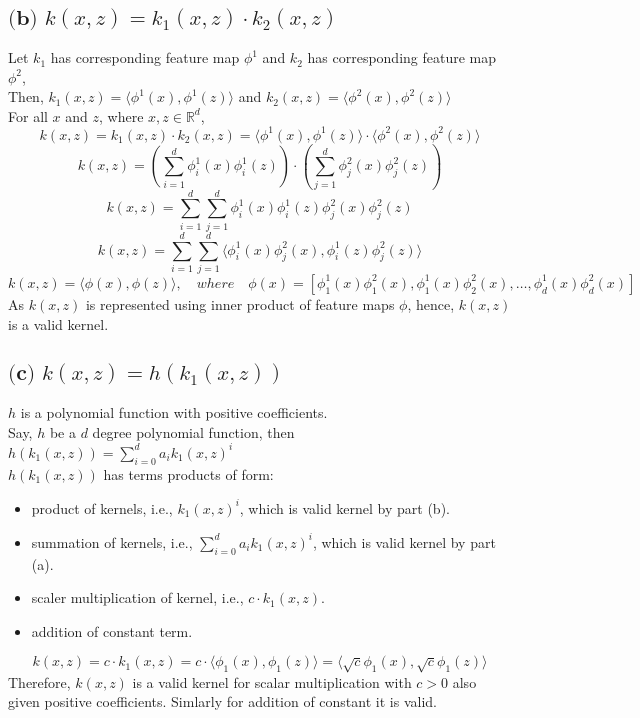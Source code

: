 \documentclass[12pt]{article}
\begin{document}
\subsection*{$ \textbf{(b) } k(x, z) = k_1(x, z) \cdot k_2(x, z) $}
Let $k_1$ has corresponding feature map $\phi^1$ and $k_2$ has corresponding feature map $\phi^2$, \\
Then, $k_1(x, z) = \langle \phi^1(x), \phi^1(z) \rangle$ and $k_2(x, z) = \langle \phi^2(x), \phi^2(z) \rangle$ \\
For all $x$ and $z$, where $x, z \in \mathbb{R}^d$,
$$ k(x, z) = k_1(x, z) \cdot k_2(x, z) = \langle \phi^1(x), \phi^1(z) \rangle \cdot \langle \phi^2(x), \phi^2(z) \rangle $$
$$ k(x, z) = \left (\sum_{i=1}^{d} \phi^1_i(x) \phi^1_i(z) \right )  \cdot \left (\sum_{j=1}^{d} \phi^2_j(x) \phi^2_j(z) \right )$$
$$ k(x, z) = \sum_{i=1}^{d} \sum_{j=1}^{d} \phi^1_i(x) \phi^1_i(z) \phi^2_j(x) \phi^2_j(z) $$
$$ k(x, z) = \sum_{i=1}^{d} \sum_{j=1}^{d} \langle \phi^1_i(x) \phi^2_j(x), \phi^1_i(z) \phi^2_j(z) \rangle $$
$$ k(x, z) = \langle \phi(x), \phi(z) \rangle , \quad where \quad \phi(x) = \left [ \phi^1_1(x) \phi^2_1(x), \phi^1_1(x) \phi^2_2(x), \ldots, \phi^1_d(x) \phi^2_d(x) \right ]$$
As $k(x, z)$ is represented using inner product of feature maps $\phi$, hence, $k(x, z)$ is a valid kernel.

\subsection*{$ \textbf{(c) } k(x, z) = h(k_1(x, z))$}
$h$ is a polynomial function with positive coefficients. \\
Say, $h$ be a $d$ degree polynomial function, then $h(k_1(x, z)) = \sum_{i=0}^{d} a_i k_1(x, z)^i$ \\
$ h(k_1(x, z)) $ has terms products of form:
\begin{itemize}
    \item product of kernels, i.e., $k_1(x, z)^i$, which is valid kernel by part (b).
    \item summation of kernels, i.e., $\sum_{i=0}^{d} a_i k_1(x, z)^i$, which is valid kernel by part (a).
    \item scaler multiplication of kernel, i.e., $c \cdot k_1(x, z)$.
    \item addition of constant term.
\end{itemize}

$$ k(x, z) = c \cdot k_1(x, z) = c \cdot \langle \phi_1(x), \phi_1(z) \rangle = \langle \sqrt{c} \phi_1(x), \sqrt{c} \phi_1(z) \rangle $$
Therefore, $k(x, z)$ is a valid kernel for scalar multiplication with $c>0$ also given positive coefficients.
Simlarly for addition of constant it is valid.
\end{document}
